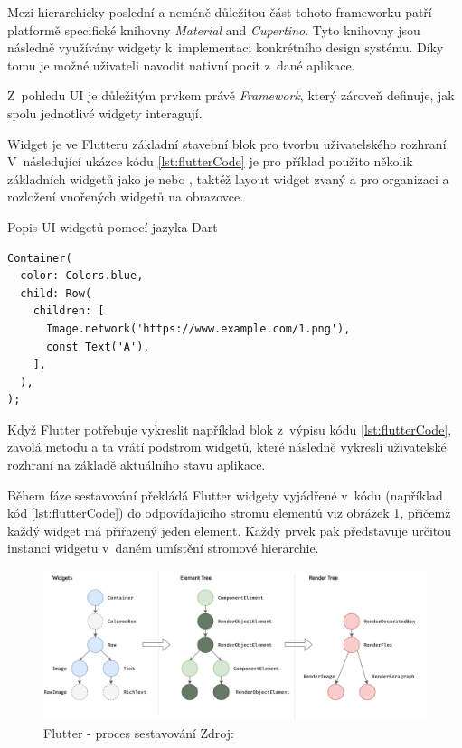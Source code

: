 Mezi hierarchicky poslední a neméně důležitou část tohoto frameworku patří platformě specifické knihovny \textit{Material} and \textit{Cupertino}. Tyto knihovny
jsou následně využívány widgety k~implementaci konkrétního design systému. Díky tomu je možné uživateli navodit nativní pocit z~dané aplikace.

\medskip

Z~pohledu UI je důležitým prvkem právě \textit{Framework}, který zároveň definuje, jak spolu jednotlivé widgety interagují.

Widget je ve Flutteru základní stavební blok pro tvorbu uživatelského rozhraní. \cite{flutterWidgets} V~následující ukázce kódu \ref{lst:flutterCode} je pro příklad použito několik 
základních widgetů jako je  nebo , taktéž layout widget zvaný  a  pro organizaci a 
rozložení vnořených widgetů na obrazovce.

\begin{listing}[H]
\caption{Popis UI widgetů pomocí jazyka Dart}\label{lst:flutterCode}
\begin{verbatim}
Container(
  color: Colors.blue,
  child: Row(
    children: [
      Image.network('https://www.example.com/1.png'),
      const Text('A'),
    ],
  ),
);
\end{verbatim}
\end{listing}

\newpage
Když Flutter potřebuje vykreslit například blok z~výpisu kódu \ref{lst:flutterCode}, zavolá metodu  a ta vrátí podstrom widgetů, které následně vykreslí uživatelské 
rozhraní na základě aktuálního stavu aplikace. \cite*{flutterArchOverview}

Během fáze sestavování překládá Flutter widgety vyjádřené v~kódu (například kód \ref{lst:flutterCode}) do odpovídajícího stromu elementů viz obrázek \ref{fig:flutter_trees}, přičemž každý widget má přiřazený jeden element. Každý prvek pak představuje určitou instanci widgetu v~daném umístění stromové hierarchie. \cite*{flutterArchOverview}


\begin{figure}[H]
  \centering
  \includegraphics[width=1\textwidth]{flutter_trees.png}
  \caption{Flutter - proces sestavování Zdroj: \cite{flutterArchOverview}}
  \label{fig:flutter_trees}
\end{figure}


